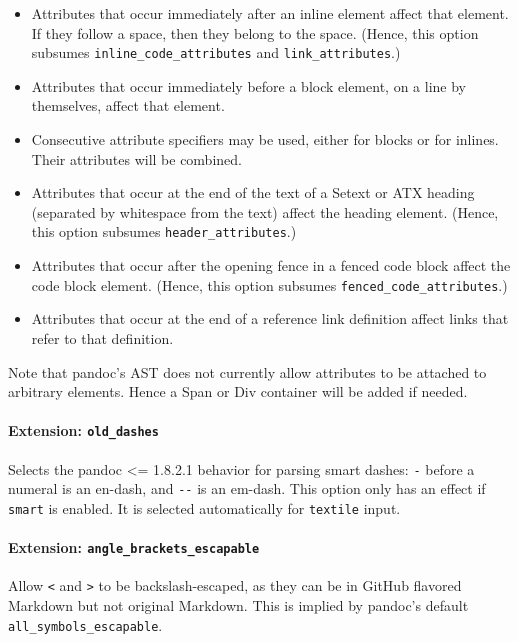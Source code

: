 \documentclass[
]{article}
\providecommand{\tightlist}{%
  \setlength{\itemsep}{0pt}\setlength{\parskip}{0pt}}
\begin{document}
\begin{itemize}
\tightlist
\item
  Attributes that occur immediately after an inline element affect that
  element. If they follow a space, then they belong to the space.
  (Hence, this option subsumes \texttt{inline\_code\_attributes} and
  \texttt{link\_attributes}.)
\item
  Attributes that occur immediately before a block element, on a line by
  themselves, affect that element.
\item
  Consecutive attribute specifiers may be used, either for blocks or for
  inlines. Their attributes will be combined.
\item
  Attributes that occur at the end of the text of a Setext or ATX
  heading (separated by whitespace from the text) affect the heading
  element. (Hence, this option subsumes \texttt{header\_attributes}.)
\item
  Attributes that occur after the opening fence in a fenced code block
  affect the code block element. (Hence, this option subsumes
  \texttt{fenced\_code\_attributes}.)
\item
  Attributes that occur at the end of a reference link definition affect
  links that refer to that definition.
\end{itemize}

Note that pandoc's AST does not currently allow attributes to be
attached to arbitrary elements. Hence a Span or Div container will be
added if needed.

\paragraph{\texorpdfstring{Extension:
\texttt{old\_dashes}}{Extension: old\_dashes}}\label{extension-old_dashes}

Selects the pandoc \textless= 1.8.2.1 behavior for parsing smart dashes:
\texttt{-} before a numeral is an en-dash, and \texttt{-\/-} is an
em-dash. This option only has an effect if \texttt{smart} is enabled. It
is selected automatically for \texttt{textile} input.

\paragraph{\texorpdfstring{Extension:
\texttt{angle\_brackets\_escapable}}{Extension: angle\_brackets\_escapable}}\label{extension-angle_brackets_escapable}

Allow \texttt{\textless{}} and \texttt{\textgreater{}} to be
backslash-escaped, as they can be in GitHub flavored Markdown but not
original Markdown. This is implied by pandoc's default
\texttt{all\_symbols\_escapable}.
\end{document}
